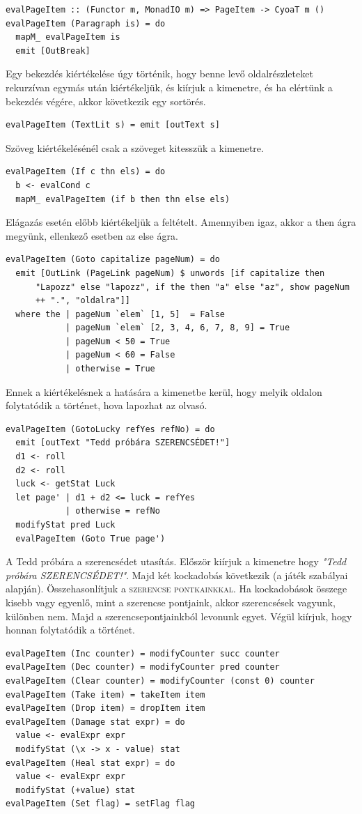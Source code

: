 \documentclass[12pt,a4paper,oneside]{report}
\newcommand{\stat}{\textsc}
\begin{document}
  \begin{verbatim}
evalPageItem :: (Functor m, MonadIO m) => PageItem -> CyoaT m ()
evalPageItem (Paragraph is) = do
  mapM_ evalPageItem is
  emit [OutBreak]
  \end{verbatim}
  Egy bekezdés kiértékelése úgy történik, hogy benne levő
  oldalrészleteket rekurzívan egymás után kiértékeljük, és kiírjuk a
  kimenetre, és ha elértünk a bekezdés végére, akkor következik egy
  sortörés.
  \begin{verbatim}
evalPageItem (TextLit s) = emit [outText s]
  \end{verbatim}
  Szöveg kiértékelésénél csak a szöveget kitesszük a kimenetre.
  \begin{verbatim}
evalPageItem (If c thn els) = do
  b <- evalCond c
  mapM_ evalPageItem (if b then thn else els)
  \end{verbatim}
  Elágazás esetén előbb kiértékeljük a feltételt. Amennyiben igaz,
  akkor a then ágra megyünk, ellenkező esetben az else ágra.
  \begin{verbatim}
evalPageItem (Goto capitalize pageNum) = do
  emit [OutLink (PageLink pageNum) $ unwords [if capitalize then
      "Lapozz" else "lapozz", if the then "a" else "az", show pageNum
      ++ ".", "oldalra"]]
  where the | pageNum `elem` [1, 5]  = False
            | pageNum `elem` [2, 3, 4, 6, 7, 8, 9] = True
            | pageNum < 50 = True
            | pageNum < 60 = False
            | otherwise = True
  \end{verbatim}
  Ennek a kiértékelésnek a hatására a kimenetbe kerül, hogy melyik
  oldalon folytatódik a történet, hova lapozhat az olvasó.
  \begin{verbatim}
evalPageItem (GotoLucky refYes refNo) = do
  emit [outText "Tedd próbára SZERENCSÉDET!"]
  d1 <- roll
  d2 <- roll
  luck <- getStat Luck
  let page' | d1 + d2 <= luck = refYes
            | otherwise = refNo
  modifyStat pred Luck
  evalPageItem (Goto True page')
  \end{verbatim}
  A Tedd próbára a szerencsédet utasítás. Először kiírjuk a kimenetre
  hogy \emph{"Tedd próbára SZERENCSÉDET!"}. Majd két kockadobás következik (a
  játék szabályai alapján). Összehasonlítjuk a \stat{szerencse
  pontkainkkal}. Ha kockadobások összege kisebb vagy egyenlő, mint a
  szerencse pontjaink, akkor szerencsések vagyunk, különben nem. Majd
  a szerencsepontjainkból levonunk egyet. Végül kiírjuk, hogy honnan
  folytatódik a történet.
  \begin{verbatim}
evalPageItem (Inc counter) = modifyCounter succ counter
evalPageItem (Dec counter) = modifyCounter pred counter
evalPageItem (Clear counter) = modifyCounter (const 0) counter
evalPageItem (Take item) = takeItem item
evalPageItem (Drop item) = dropItem item
evalPageItem (Damage stat expr) = do
  value <- evalExpr expr
  modifyStat (\x -> x - value) stat
evalPageItem (Heal stat expr) = do
  value <- evalExpr expr
  modifyStat (+value) stat
evalPageItem (Set flag) = setFlag flag
  \end{verbatim}
\end{document}
